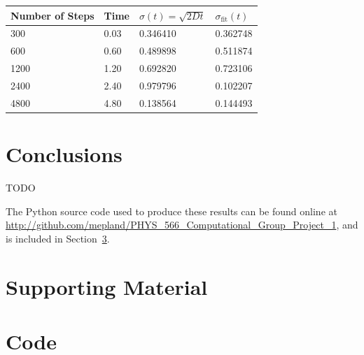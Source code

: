 \documentclass[notitlepage,aps,prd,nofootinbib]{revtex4-1}
\begin{document}
\begin{center}
	\begin{tabular}{ | p{3cm} | p{3cm} | p{3cm} | p{3cm} |}
		\hline
		Number of Steps & Time & $\sigma(t) = \sqrt{2Dt}$ & $\sigma_{\mathrm{fit}}(t)$ \\
		\hline
		300  & 0.03 & 0.346410 & 0.362748 \\
		\hline
		600  & 0.60 & 0.489898 & 0.511874 \\ 
		\hline
		1200 & 1.20 & 0.692820 & 0.723106 \\
		\hline
		2400 & 2.40 & 0.979796 & 0.102207 \\
		\hline
		4800 & 4.80 & 0.138564 & 0.144493 \\
		\hline
	\end{tabular}
\end{center}
\newpage


\clearpage
\section{Conclusions}
\label{sec:Conclusions}
TODO

The Python source code used to produce these results can be found online at \url{http://github.com/mepland/PHYS_566_Computational_Group_Project_1}, and is included in Section~\ref{sec:code}.


\clearpage
\section{Supporting Material}
\label{sec:Supporting_Material}



\clearpage



\clearpage
\section{Code}
\label{sec:code}

\end{document}
